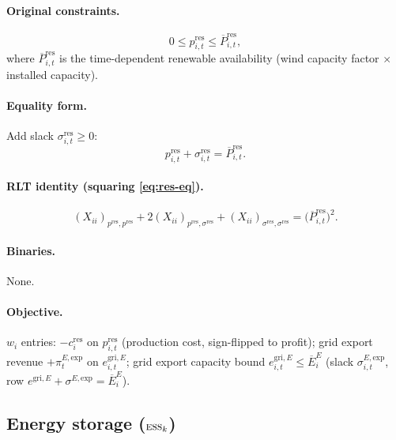 \documentclass[11pt]{article}
\theoremstyle{definition}
\begin{document}
\paragraph{Original constraints.}
\begin{equation}
0\le p^{\mathrm{res}}_{i,t}\le\overline{P}^{\mathrm{res}}_{i,t},
\label{eq:res-orig}
\end{equation}
where $\overline{P}^{\mathrm{res}}_{i,t}$ is the time-dependent
renewable availability (wind capacity factor $\times$ installed
capacity).

\paragraph{Equality form.}  Add slack $\sigma^{\mathrm{res}}_{i,t}\ge0$:
\begin{equation}
p^{\mathrm{res}}_{i,t}+\sigma^{\mathrm{res}}_{i,t}
  =\overline{P}^{\mathrm{res}}_{i,t}.
\label{eq:res-eq}
\end{equation}

\paragraph{RLT identity (squaring \eqref{eq:res-eq}).}
\begin{equation}
(X_{ii})_{p^{\mathrm{res}},p^{\mathrm{res}}}
+2(X_{ii})_{p^{\mathrm{res}},\sigma^{\mathrm{res}}}
+(X_{ii})_{\sigma^{\mathrm{res}},\sigma^{\mathrm{res}}}
=\bigl(\overline{P}^{\mathrm{res}}_{i,t}\bigr)^{2}.
\label{eq:res-rlt}
\end{equation}

\paragraph{Binaries.} None.

\paragraph{Objective.}
$w_i$ entries: $-c^{\mathrm{res}}_i$ on $p^{\mathrm{res}}_{i,t}$
(production cost, sign-flipped to profit); grid export revenue
$+\pi^{E,\mathrm{exp}}_t$ on $e^{\mathrm{gri},E}_{i,t}$; grid export
capacity bound $e^{\mathrm{gri},E}_{i,t}\le\overline{E}^{E}_i$ (slack
$\sigma^{E,\mathrm{exp}}_{i,t}$, row
$e^{\mathrm{gri},E}+\sigma^{E,\mathrm{exp}}=\overline{E}^{E}_i$).

\subsection{Energy storage (\texorpdfstring{$\textsc{ess}_k$}{ESS\_k})}
\label{sec:ess}
\end{document}
